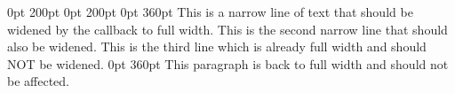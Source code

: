 \documentclass[a4paper,11pt]{article}
\begin{document}
 0pt 200pt 0pt 200pt 0pt 360pt
This is a narrow line of text that should be widened by the callback to full width.
This is the second narrow line that should also be widened.
This is the third line which is already full width and should NOT be widened.
 0pt 360pt
This paragraph is back to full width and should not be affected.
\end{document}
